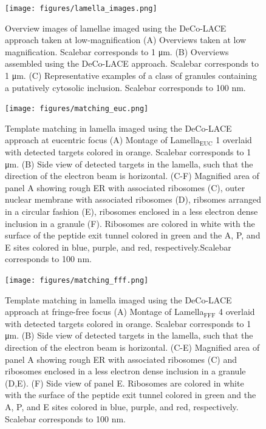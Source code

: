 \documentclass[
]{article}
\newenvironment{fignos:tagged-figure}[1][]{
    \let\oldthefigure\thefigure
    \let\oldtheHfigure\theHfigure
    \renewcommand{\thefigure}{#1}
    \renewcommand{\theHfigure}{#1}
  }{
    \let\thefigure\oldthefigure
    \let\theHfigure\oldtheHfigure
    \addtocounter{figure}{-1}
  }
\providecommand{\DIFaddbegin}{} %
\providecommand{\DIFaddend}{} %
\providecommand{\DIFdelbegin}{} %
\providecommand{\DIFdelend}{} %
\newcommand{\DIFscaledelfig}{0.5}
\newlength{\DIFdelgraphicswidth} %
\newlength{\DIFdelgraphicsheight} %
\newcommand{\DIFaddincludegraphics}[2][]{{\color{blue}\fbox{\DIFOincludegraphics[#1]{#2}}}} %
\newcommand{\DIFdelincludegraphics}[2][]{%
\sbox{\DIFdelgraphicsbox}{\DIFOincludegraphics[#1]{#2}}%
\settoboxwidth{\DIFdelgraphicswidth}{\DIFdelgraphicsbox} %
\settoboxtotalheight{\DIFdelgraphicsheight}{\DIFdelgraphicsbox} %
\scalebox{\DIFscaledelfig}{%
\parbox[b]{\DIFdelgraphicswidth}{\usebox{\DIFdelgraphicsbox}\\[-\baselineskip] \rule{\DIFdelgraphicswidth}{0em}}\llap{\resizebox{\DIFdelgraphicswidth}{\DIFdelgraphicsheight}{%
\setlength{\unitlength}{\DIFdelgraphicswidth}%
\begin{picture}(1,1)%
\thicklines\linethickness{2pt} %
{\color[rgb]{1,0,0}\put(0,0){\framebox(1,1){}}}%
{\color[rgb]{1,0,0}\put(0,0){\line( 1,1){1}}}%
{\color[rgb]{1,0,0}\put(0,1){\line(1,-1){1}}}%
\end{picture}%
}\hspace*{3pt}}} %
} %
\DeclareRobustCommand{\DIFaddbegin}{\DIFOaddbegin \let\includegraphics\DIFaddincludegraphics} %
\DeclareRobustCommand{\DIFaddend}{\DIFOaddend \let\includegraphics\DIFOincludegraphics} %
\DeclareRobustCommand{\DIFdelbegin}{\DIFOdelbegin \let\includegraphics\DIFdelincludegraphics} %
\DeclareRobustCommand{\DIFdelend}{\DIFOaddend \let\includegraphics\DIFOincludegraphics} %
\begin{document}
\DIFdelbegin %
\DIFdelend \DIFaddbegin \begin{fignos:tagged-figure}
\DIFaddend 

\begin{figure}
\hypertarget{fig:lamella_images}{%
\centering
\texttt{[image: figures/lamella\_images.png]}
\caption{Overview images of lamellae imaged using the DeCo-LACE approach taken
at low-magnification (A) Overviews taken at low magnification. Scalebar
corresponds to 1 μm. (B) Overviews assembled using the DeCo-LACE
approach. Scalebar corresponds to 1 μm. (C) Representative examples of a
class of granules containing a putatively cytosolic inclusion. Scalebar
corresponds to 100 nm.}\label{fig:lamella_images}
}
\end{figure}

\end{fignos:tagged-figure}

\begin{figure}
\hypertarget{fig:matching_euc}{%
\centering
\texttt{[image: figures/matching\_euc.png]}
\caption{Template matching in lamella imaged using the DeCo-LACE approach at
eucentric focus (A) Montage of Lamella\(_\textrm{EUC}\) 1 overlaid with
detected targets colored in orange. Scalebar corresponds to 1 μm. (B)
Side view of detected targets in the lamella, such that the direction of
the electron beam is horizontal. (C-F) Magnified area of panel A showing
rough ER with associated ribosomes (C), outer nuclear membrane with
associated ribosomes (D), ribsomes arranged in a circular fashion (E),
ribosomes enclosed in a less electron dense inclusion in a granule (F).
Ribosomes are colored in white with the surface of the peptide exit
tunnel colored in green and the A, P, and E sites colored in blue,
purple, and red, respectively.Scalebar corresponds to 100
nm.}\label{fig:matching_euc}
}
\end{figure}

\begin{figure}
\hypertarget{fig:matching_fff}{%
\centering
\texttt{[image: figures/matching\_fff.png]}
\caption{Template matching in lamella imaged using the DeCo-LACE approach at
fringe-free focus (A) Montage of Lamella\(_\textrm{FFF}\) 4 overlaid with
detected targets colored in orange. Scalebar corresponds to 1 μm. (B)
Side view of detected targets in the lamella, such that the direction of
the electron beam is horizontal. (C-E) Magnified area of panel A showing
rough ER with associated ribosomes (C) and ribosomes enclosed in a less
electron dense inclusion in a granule (D,E). (F) Side view of panel E.
Ribosomes are colored in white with the surface of the peptide exit
tunnel colored in green and the A, P, and E sites colored in blue,
purple, and red, respectively. Scalebar corresponds to 100
nm.}\label{fig:matching_fff}
}
\end{figure}
\end{document}
